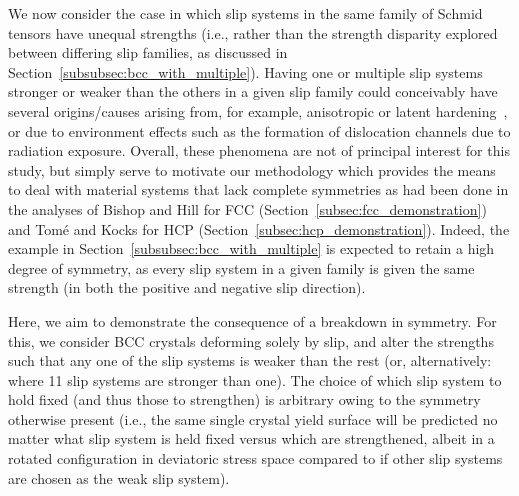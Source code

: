 \documentclass[preprint,3p,times,sort&compress,letterpaper,12pt]{elsarticle} %
\begin{document}
We now consider the case in which slip systems in the same family of Schmid tensors have unequal strengths (i.e., rather than the strength disparity explored between differing slip families, as discussed in Section~\ref{subsubsec:bcc_with_multiple}). Having one or multiple slip systems stronger or weaker than the others in a given slip family could conceivably have several origins/causes arising from, for example, anisotropic or latent hardening~\cite{Kocks1964b}, or due to environment effects such as the formation of dislocation channels due to radiation exposure. Overall, these phenomena are not of principal interest for this study, but simply serve to motivate our methodology which provides the means to deal with material systems that lack complete symmetries as had been done in the analyses of Bishop and Hill for FCC (Section~\ref{subsec:fcc_demonstration}) and Tom{\'e} and Kocks for HCP (Section~\ref{subsec:hcp_demonstration}). Indeed, the example in Section~\ref{subsubsec:bcc_with_multiple} is expected to retain a high degree of symmetry, as every slip system in a given family is given the same strength (in both the positive and negative slip direction).

Here, we aim to demonstrate the consequence of a breakdown in symmetry. For this, we consider BCC crystals deforming solely by  slip, and alter the strengths such that any one of the slip systems is weaker than the rest (or, alternatively: where 11 slip systems are stronger than one). The choice of which slip system to hold fixed (and thus those to strengthen) is arbitrary owing to the symmetry otherwise present (i.e., the same single crystal yield surface will be predicted no matter what slip system is held fixed versus which are strengthened, albeit in a rotated configuration in deviatoric stress space compared to if other slip systems are chosen as the weak slip system).
\end{document}
